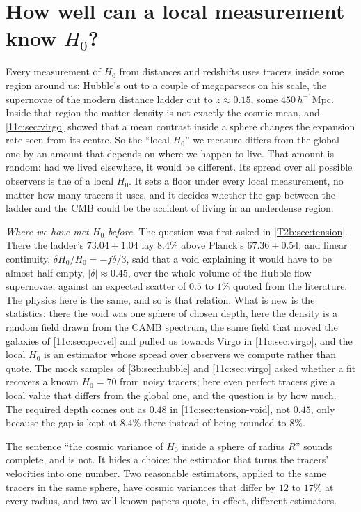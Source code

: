 \section{How well can a local measurement know \texorpdfstring{$H_0$}{H0}?}
\label{11c:sec:cosmicvar}

Every measurement of $H_0$ from distances and redshifts uses tracers inside some
region around us: Hubble's out to a couple of megaparsecs on his scale, the
supernovae of the modern distance ladder out to $z\approx0.15$, some
$450\,h^{-1}$Mpc. Inside that region the matter density is not exactly the cosmic
mean, and \cref{11c:sec:virgo} showed that a mean contrast inside a sphere changes
the expansion rate seen from its centre. So the ``local $H_0$'' we measure differs
from the global one by an amount that depends on where we happen to live. That
amount is random: had we lived elsewhere, it would be different. Its spread over
all possible observers is the  of a local $H_0$. It sets a
floor under every local measurement, no matter how many tracers it uses, and it
decides whether the gap between the ladder and the CMB could be the accident of
living in an underdense region.

\emph{Where we have met $H_0$ before.} The question was first asked in
\cref{T2b:sec:tension}. There the ladder's $73.04\pm1.04$ lay $8.4\%$ above Planck's
$67.36\pm0.54$, and linear continuity, $\delta H_0/H_0=-f\delta/3$, said that a void
explaining it would have to be almost half empty, $|\delta|\approx0.45$, over the whole
volume of the Hubble-flow supernovae, against an expected scatter of $0.5$ to $1\%$
quoted from the literature. The physics here is the same, and so is that relation. What
is new is the statistics: there the void was one sphere of chosen depth, here the
density is a random field drawn from the CAMB spectrum, the same field that moved the
galaxies of \cref{11c:sec:pecvel} and pulled us towards Virgo in \cref{11c:sec:virgo},
and the local $H_0$ is an estimator whose spread over observers we compute rather than
quote. The mock samples of \cref{3b:sec:hubble} and \cref{11c:sec:virgo} asked whether a
fit recovers a known $H_0=70$ from noisy tracers; here even perfect tracers give a
local value that differs from the global one, and the question is by how much. The
required depth comes out as $0.48$ in \cref{11c:sec:tension-void}, not $0.45$, only
because the gap is kept at $8.4\%$ there instead of being rounded to $8\%$.

The sentence ``the cosmic variance of $H_0$ inside a sphere of radius $R$'' sounds
complete, and is not. It hides a choice: the estimator that turns the tracers'
velocities into one number. Two reasonable estimators, applied to
the same tracers in the same sphere, have cosmic variances that differ by $12$ to
$17\%$ at every radius, and two well-known papers quote, in effect, different estimators.

